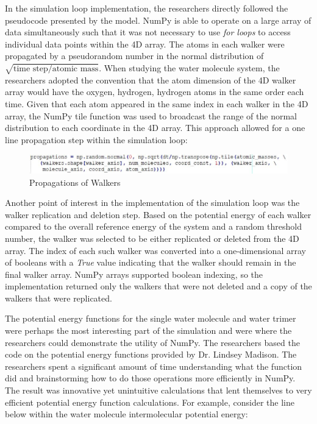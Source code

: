 \documentclass[journal=jacsat,manuscript=article]{achemso}
\begin{document}
In the simulation loop implementation, the researchers directly followed the pseudocode presented by the model. NumPy is able to operate on a large array of data simultaneously such that it was not necessary to use \textit{for loops} to access individual data points within the 4D array. The atoms in each walker were propagated by a pseudorandom number in the normal distribution of $\sqrt{\text{time step}/\text{atomic mass}}$. When studying the water molecule system, the researchers adopted the convention that the atom dimension of the 4D walker array would have the oxygen, hydrogen, hydrogen atoms in the same order each time. Given that each atom appeared in the same index in each walker in the 4D array, the NumPy tile function was used to broadcast the range of the normal distribution to each coordinate in the 4D array. This approach allowed for a one line propagation step within the simulation loop: 

\begin{figure}[H]
  \caption{Propagations of Walkers}
  \includegraphics[width=\linewidth]{figures/propagations.jpg}
\end{figure}

Another point of interest in the implementation of the simulation loop was the walker replication and deletion step. Based on the potential energy of each walker compared to the overall reference energy of the system and a random threshold number, the walker was selected to be either replicated or deleted from the 4D array. The index of each such walker was converted into a one-dimensional array of booleans with a \textit{True} value indicating that the walker should remain in the final walker array. NumPy arrays supported boolean indexing, so the implementation returned only the walkers that were not deleted and a copy of the walkers that were replicated.

The potential energy functions for the single water molecule and water trimer were perhaps the most interesting part of the simulation and were where the researchers could demonstrate the utility of NumPy. The researchers based the code on the potential energy functions provided by Dr. Lindsey Madison. The researchers spent a significant amount of time understanding what the function did and brainstorming how to do those operations more efficiently in NumPy. The result was innovative yet unintuitive calculations that lent themselves to very efficient potential energy function calculations. For example, consider the line below within the water molecule intermolecular potential energy:
\end{document}
